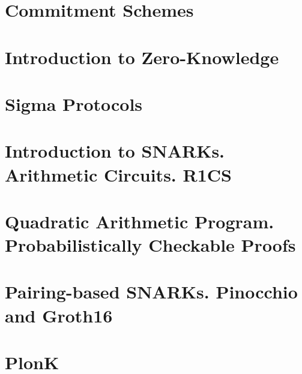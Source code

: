 \documentclass{zkdl-template-105x135-nohead}
\begin{document}
    

    \section{Commitment Schemes} \label{section:commitments}

     

    \section{Introduction to Zero-Knowledge} \label{section:intro-zk}

    

    \section{Sigma Protocols} \label{section:sigma}

    

    \section[Arithmetic Circuits. R1CS]{Introduction to SNARKs. Arithmetic Circuits. R1CS} \label{section:r1cs}

    \label{secation:circuits}

    \section[Quadratic Arithmetic Program]{Quadratic Arithmetic Program. Probabilistically Checkable Proofs} \label{section:qap}

    

    \section[Pairing-based SNARKs]{Pairing-based SNARKs. Pinocchio and Groth16} \label{section:groth16}

    

    \section{PlonK} \label{section:plonk}

    


    
    
    
    
\end{document}
